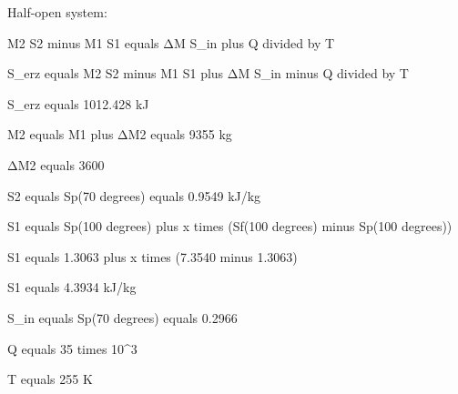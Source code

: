 Half-open system:  

M2 S2 minus M1 S1 equals ΔM S_in plus Q divided by T  

S_erz equals M2 S2 minus M1 S1 plus ΔM S_in minus Q divided by T  

S_erz equals 1012.428 kJ  

M2 equals M1 plus ΔM2 equals 9355 kg  

ΔM2 equals 3600  

S2 equals Sp(70 degrees) equals 0.9549 kJ/kg  

S1 equals Sp(100 degrees) plus x times (Sf(100 degrees) minus Sp(100 degrees))  

S1 equals 1.3063 plus x times (7.3540 minus 1.3063)  

S1 equals 4.3934 kJ/kg  

S_in equals Sp(70 degrees) equals 0.2966  

Q equals 35 times 10^3  

T equals 255 K